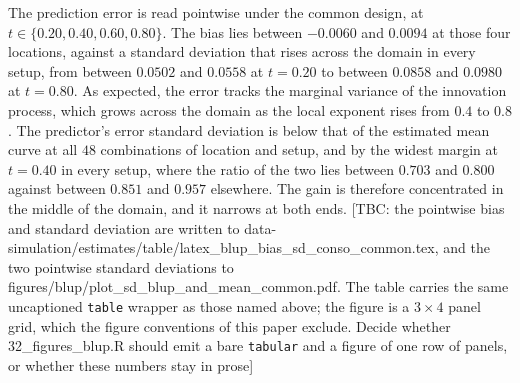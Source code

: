 The prediction error is read pointwise under the common design, at $t \in \{0.20, 0.40, 0.60, 0.80\}$. The bias lies between $-0.0060$ and $0.0094$ at those four locations, against a standard deviation that rises across the domain in every setup, from between $0.0502$ and $0.0558$ at $t = 0.20$ to between $0.0858$ and $0.0980$ at $t = 0.80$. As expected, the error tracks the marginal variance of the innovation process, which grows across the domain as the local exponent rises from $0.4$ to $0.8$. The predictor's error standard deviation is below that of the estimated mean curve at all $48$ combinations of location and setup, and by the widest margin at $t = 0.40$ in every setup, where the ratio of the two lies between $0.703$ and $0.800$ against between $0.851$ and $0.957$ elsewhere. The gain is therefore concentrated in the middle of the domain, and it narrows at both ends.
[TBC: the pointwise bias and standard deviation are written to data-simulation/estimates/table/latex\_blup\_bias\_sd\_conso\_common.tex, and the two pointwise standard deviations to figures/blup/plot\_sd\_blup\_and\_mean\_common.pdf. The table carries the same uncaptioned \texttt{table} wrapper as those named above; the figure is a $3\times4$ panel grid, which the figure conventions of this paper exclude. Decide whether 32\_figures\_blup.R should emit a bare \texttt{tabular} and a figure of one row of panels, or whether these numbers stay in prose]
\color{black}

\begin{table}[h!]
	\centering
	\color{magenta}
	
	\caption{\small Weighted integrated squared error \eqref{eq:weighted_ise} of the adaptive predictor under the independent design, taken against the noiseless target curve, over $400$ independent functional time series generated according to \eqref{blup:FTS_mod1} for each of the twelve setups $(N, \lambda)$. \textbf{Panel A} holds the adaptive predictor and \textbf{Panel C} the estimated mean curve, which is the predictor's limit as $\alpha$ grows. \textit{Relative} is the median of the per-replication ratios of a panel's score to the adaptive predictor's, and not the ratio of the medians, so that Panel A is $1.00$ by construction; \textit{BLUP better} is the share of replications on which the adaptive predictor is the closer of the two to the target curve. \textbf{Panel B} is the slot the competing method's results will occupy.}
	\label{tab:blup_benchmark_random}
	\color{black}
\end{table}

